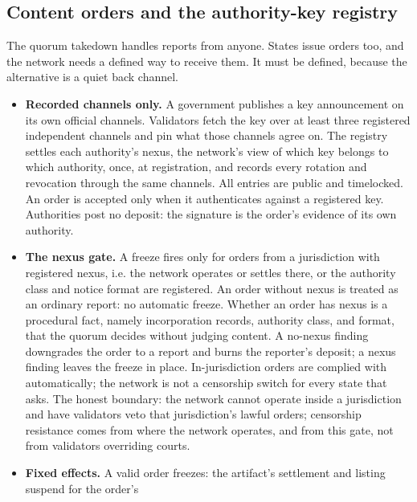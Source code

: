 \documentclass[11pt]{article}
\begin{document}
\subsection{Content orders and the authority-key registry}

The quorum takedown handles reports from anyone. States issue
orders too, and the network needs a defined way to receive them.
It must be defined, because the alternative is a quiet back channel.

\begin{itemize}
    \item \textbf{Recorded channels only.} A government publishes a
          key announcement on its own official channels. Validators fetch
          the key over at least three registered independent channels and
          pin what those channels agree on. The registry settles each
          authority's nexus, the network's view of which key belongs to
          which authority, once, at registration, and records every
          rotation and revocation through the same channels. All entries
          are public and timelocked. An order is accepted only when it
          authenticates against a registered key. Authorities post no
          deposit: the signature is the order's evidence of its own
          authority.
    \item \textbf{The nexus gate.} A freeze fires only for orders
          from a jurisdiction with registered nexus, i.e. the network
          operates or settles there, or the authority class and notice
          format are registered. An order without nexus is treated as an
          ordinary report: no automatic freeze. Whether an order has nexus
          is a procedural fact, namely incorporation records, authority
          class, and format, that the quorum decides without judging content. A
          no-nexus finding downgrades the order to a report and burns the
          reporter's deposit; a nexus finding leaves the freeze in place.
          In-jurisdiction orders are complied with automatically; the
          network is not a censorship switch for every state that asks.
          The honest boundary: the network cannot operate inside a
          jurisdiction and have validators veto that jurisdiction's lawful
          orders; censorship resistance comes from where the network
          operates, and from this gate, not from validators overriding
          courts.
    \item \textbf{Fixed effects.} A valid order freezes: the
          artifact's settlement and listing suspend for the order's

\end{itemize}
\end{document}
